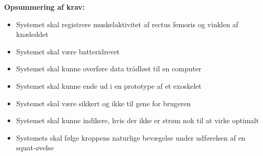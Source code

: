 \vspace{3mm}
\textbf{Opsummering af krav:}
\begin{itemize}
\item[\text{\sffamily \checkmark}] Systemet skal registrere muskelaktivitet af rectus femoris og vinklen af knæleddet
\item[\text{\sffamily \checkmark}] Systemet skal være batteridrevet
\item[\text{\sffamily \checkmark}] Systemet skal kunne overføre data trådløst til en computer
\item[\text{\sffamily \checkmark}] Systemet skal kunne ende ud i en prototype af et exoskelet
\item[\text{\sffamily \checkmark}] Systemet skal være sikkert og ikke til gene for brugeren 
\item[\text{\sffamily \checkmark}] Systemet skal kunne indikere, hvis der ikke er strøm nok til at virke optimalt
\item[\text{\sffamily \checkmark}] Systemets skal følge kroppens naturlige bevægelse under udførelsen af en squat-øvelse
\end{itemize}
